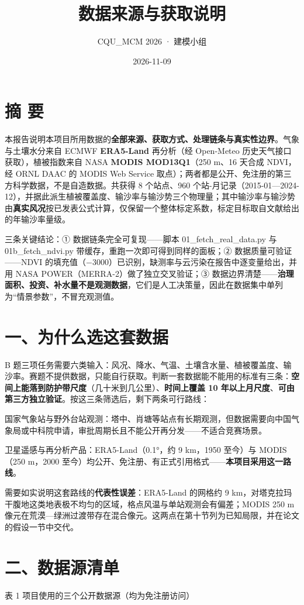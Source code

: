 \documentclass[11pt,a4paper]{ctexart}
\title{数据来源与获取说明}
\author{CQU\_MCM 2026 · 建模小组}
\date{2026-11-09}
\begin{document}
\maketitle
\thispagestyle{empty}
\newpage

\section*{摘  要}
本报告说明本项目所用数据的\textbf{全部来源、获取方式、处理链条与真实性边界}。气象与土壤水分来自 ECMWF \textbf{ERA5-Land} 再分析（经 Open-Meteo 历史天气接口获取），植被指数来自 NASA \textbf{MODIS MOD13Q1}（250 m、16 天合成 NDVI，经 ORNL DAAC 的 MODIS Web Service 取点）；两者都是公开、免注册的第三方科学数据，不是自造数据。共获得 8 个站点、960 个站-月记录（2015-01—2024-12），并据此派生植被覆盖度、输沙率与输沙势三个物理量；其中输沙率与输沙势由\textbf{真实风况}按已发表公式计算，仅保留一个整体标定系数，标定目标取自文献给出的年输沙率量级。

三条关键结论：① 数据链条完全可复现——脚本 01\_fetch\_real\_data.py 与 01b\_fetch\_ndvi.py 带缓存，重跑一次即可得到同样的面板；② 数据质量可验证——NDVI 的填充值（−3000）已识别，缺测率与云污染在报告中逐变量给出，并用 NASA POWER（MERRA-2）做了独立交叉验证；③ 数据边界清楚——\textbf{治理面积、投资、补水量不是观测数据}，它们是人工决策量，因此在数据集中单列为“情景参数”，不冒充观测值。


\section*{一、为什么选这套数据}
B 题三项任务需要六类输入：风况、降水、气温、土壤含水量、植被覆盖度、输沙率。赛题不提供数据，只能自行获取。判断一套数据能不能用的标准有三条：\textbf{空间上能落到防护带尺度}（几十米到几公里）、\textbf{时间上覆盖 10 年以上月尺度}、\textbf{可由第三方独立验证}。按这三条筛选后，剩下两条可行路线：

国家气象站与野外台站观测：塔中、肖塘等站点有长期观测，但数据需要向中国气象局或中科院申请，审批周期长且不能公开再分发——不适合竞赛场景。

卫星遥感与再分析产品：ERA5-Land（0.1°，约 9 km，1950 至今）与 MODIS（250 m，2000 至今）均公开、免注册、有正式引用格式——\textbf{本项目采用这一路线}。

需要如实说明这套路线的\textbf{代表性误差}：ERA5-Land 的网格约 9 km，对塔克拉玛干腹地这类地表极不均匀的区域，格点风温与单站观测会有偏差；MODIS 250 m 像元在荒漠—绿洲过渡带存在混合像元。这两点在第十节列为已知局限，并在论文的假设一节中交代。


\section*{二、数据源清单}
表 1  项目使用的三个公开数据源（均为免注册访问）
\end{document}
